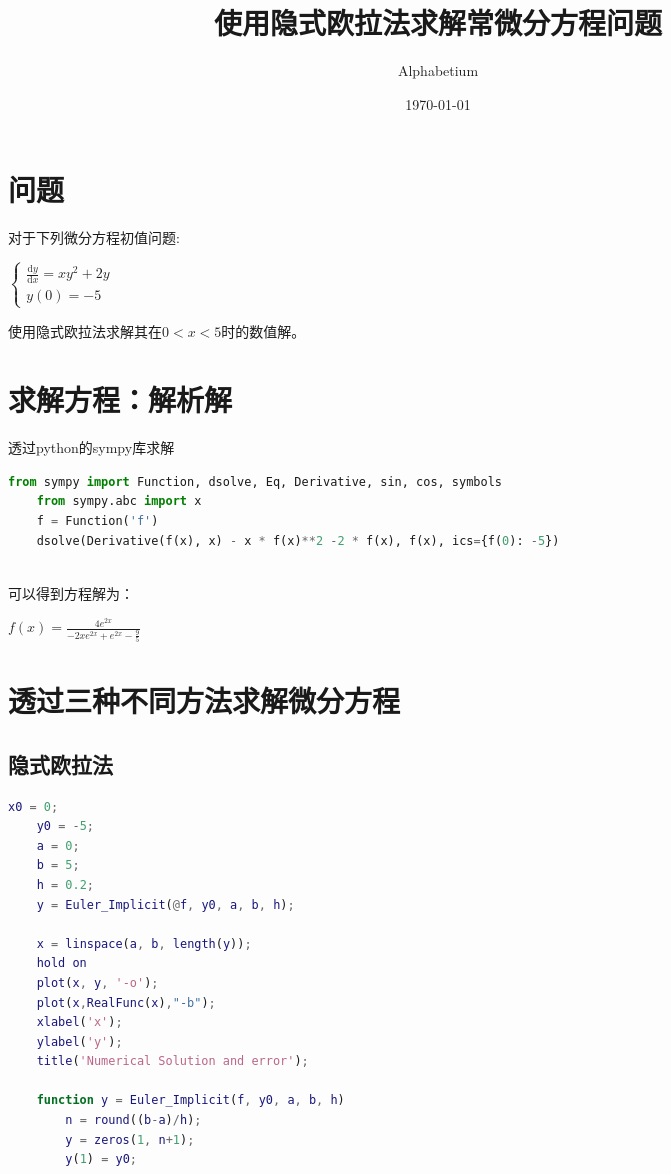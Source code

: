 \documentclass[12pt, a4paper, oneside]{ctexart}
\title{使用隐式欧拉法求解常微分方程问题}
\date{\today}
\author{Alphabetium}
\begin{document}
\begin{spacing}{2.0}
\tableofcontents
\maketitle

\section{问题}
对于下列微分方程初值问题:
\begin{center}
$    \left\{\begin{matrix} 
        \frac{\mathrm{d}y}{\mathrm{d}x}=xy^2+2y \\  
        y(0)=-5 
      \end{matrix}\right. $
\end{center}
使用隐式欧拉法求解其在$0<x<5$时的数值解。
\section{求解方程：解析解}
透过python的sympy库求解
\begin{lstlisting}[language=Python, caption=0.1s]
    from sympy import Function, dsolve, Eq, Derivative, sin, cos, symbols
    from sympy.abc import x
    f = Function('f')
    dsolve(Derivative(f(x), x) - x * f(x)**2 -2 * f(x), f(x), ics={f(0): -5})
    
\end{lstlisting}
可以得到方程解为：
\begin{center}
    $f{\left(x \right)} = \frac{4 e^{2 x}}{- 2 x e^{2 x} + e^{2 x} - \frac{9}{5}}$
\end{center}
\section{透过三种不同方法求解微分方程}
\subsection{隐式欧拉法}
\begin{lstlisting}[language=MATLAB, caption=隐式欧拉法]
    x0 = 0;
    y0 = -5;
    a = 0;
    b = 5;
    h = 0.2;
    y = Euler_Implicit(@f, y0, a, b, h);
    
    x = linspace(a, b, length(y));
    hold on
    plot(x, y, '-o');
    plot(x,RealFunc(x),"-b");
    xlabel('x');
    ylabel('y');
    title('Numerical Solution and error');

    function y = Euler_Implicit(f, y0, a, b, h)
        n = round((b-a)/h);
        y = zeros(1, n+1);
        y(1) = y0;
        

\end{lstlisting}
\end{spacing}
\end{document}
